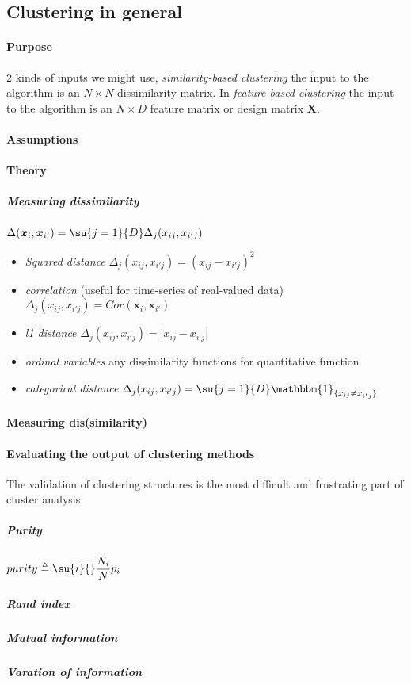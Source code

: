 \subsection{Clustering in general}

\paragraph{Purpose}
2 kinds of inputs we might use, \emph{similarity-based clustering} the input to the algorithm is an
$N\times N$ dissimilarity matrix. In \emph{feature-based clustering} the input to the algorithm
is an $N\times D$ feature matrix or design matrix $\bm{X}$.


\paragraph{Assumptions}
\paragraph{Theory}
\subparagraph{Measuring dissimilarity}
$\Delta(\bm{x}_{i}, \bm{x}_{i'}) = \su{j=1}{D}\Delta_{j}(x_{ij},x_{i'j})$
\begin{itemize}
    \item \emph{Squared distance} $\Delta_{j}(x_{ij},x_{i'j}) = (x_{ij}-x_{i'j})^{2}$
    \item \emph{correlation} (useful for time-series of real-valued data) 
        $\Delta_{j}(x_{ij},x_{i'j}) = Cor(\bm{x}_{i},\bm{x}_{i'})$
    \item \emph{l1 distance} $\Delta_{j}(x_{ij},x_{i'j}) = |x_{ij}-x_{i'j}|$
    \item \emph{ordinal variables} any dissimilarity functions for quantitative function
     \item \emph{categorical distance} $\Delta_{j}(x_{ij},x_{i'j}) = \su{j=1}{D}\mathbbm{1}_{\{x_{ij}
         \neq x_{i'j}\}}$
\end{itemize}

\paragraph{Measuring dis(similarity)}
\paragraph{Evaluating the output of clustering methods}
The validation of clustering structures is the most difficult and frustrating part of cluster
analysis
\subparagraph{Purity}
$purity\triangleq \su{i}{}\dfrac{N_{i}}{N}p_{i}$
\subparagraph{Rand index}
\subparagraph{Mutual information}
\subparagraph{Varation of information}

